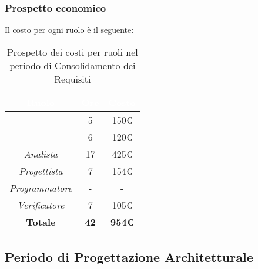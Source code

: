 \subsubsection{Prospetto economico}
Il costo per ogni ruolo è il seguente:
\begin{table}[H]
	\begin{center}
		\begin{tabular}{ |c c c|}
		\rowcolor{darkblue} 
		\textcolor{white}{\textbf{Ruolo}} & \textcolor{white}{\textbf{Ore}} & \textcolor{white}{\textbf{Costo}} \\ \hline
		\textit{\Responsabile} 	& 5 	& 150€ \\ \hline
		\textit{\Amministratore} 	& 6 	& 120€ \\ \hline
		\textit{Analista} 		& 17 	& 425€ \\ \hline
		\textit{Progettista} 	& 7 	& 154€ \\ \hline
		\textit{Programmatore}  	& - 	& - \\ \hline
		\textit{Verificatore} 	& 7 	& 105€ \\ \hline
		\textbf{Totale} & \textbf{42} & \textbf{954€} \\ \hline
		\end{tabular}
	\caption{ Prospetto dei costi per ruoli nel periodo di Consolidamento dei Requisiti}
	\end{center}
\end{table}

\subsection{Periodo di Progettazione Architetturale}
